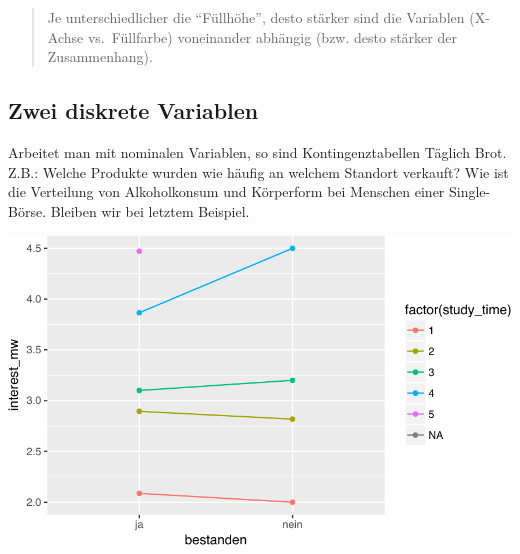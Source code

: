 \documentclass[12pt,]{book}
\newenvironment{Shaded}{\begin{snugshade}}{\end{snugshade}}
\newcommand{\KeywordTok}[1]{\textcolor[rgb]{0.13,0.29,0.53}{\textbf{{#1}}}}
\newcommand{\DataTypeTok}[1]{\textcolor[rgb]{0.13,0.29,0.53}{{#1}}}
\newcommand{\DecValTok}[1]{\textcolor[rgb]{0.00,0.00,0.81}{{#1}}}
\newcommand{\StringTok}[1]{\textcolor[rgb]{0.31,0.60,0.02}{{#1}}}
\newcommand{\NormalTok}[1]{{#1}}
\begin{document}
\begin{quote}
Je unterschiedlicher die ``Füllhöhe'', desto stärker sind die Variablen
(X-Achse vs.~Füllfarbe) voneinander abhängig (bzw. desto stärker der
Zusammenhang).
\end{quote}

\subsection{Zwei diskrete Variablen}\label{zwei-diskrete-variablen}

Arbeitet man mit nominalen Variablen, so sind Kontingenztabellen Täglich
Brot. Z.B.: Welche Produkte wurden wie häufig an welchem Standort
verkauft? Wie ist die Verteilung von Alkoholkonsum und Körperform bei
Menschen einer Single-Börse. Bleiben wir bei letztem Beispiel.

\begin{Shaded}
\end{Shaded}

\begin{center}\includegraphics[width=0.7\linewidth]{050_Daten_visualisieren_files/figure-latex/unnamed-chunk-24-1} \end{center}
\end{document}
